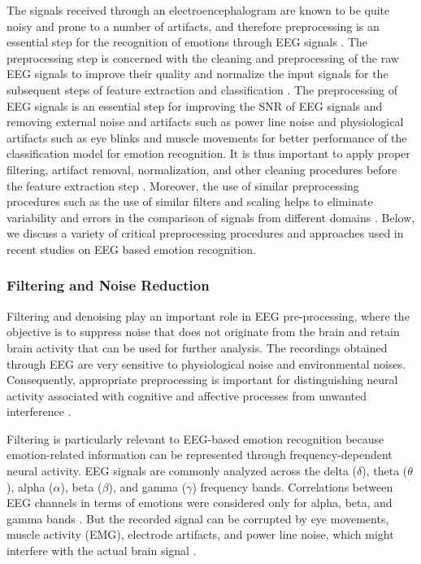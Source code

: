 \documentclass[ASNA,twocolumn]{USG}
\begin{document}
The signals received through an electroencephalogram are known to be quite noisy and prone to a number of artifacts, and therefore preprocessing is an essential step for the recognition of emotions through EEG signals \cite{somers2018generic}. The preprocessing step is concerned with the cleaning and preprocessing of the raw EEG signals to improve their quality and normalize the input signals for the subsequent steps of feature extraction and classification \cite{erat2024emotion}. The preprocessing of EEG signals is an essential step for improving the SNR of EEG signals and removing external noise and artifacts such as power line noise and physiological artifacts such as eye blinks and muscle movements for better performance of the classification model for emotion recognition. It is thus important to apply proper filtering, artifact removal, normalization, and other cleaning procedures before the feature extraction step \cite{val2019optimization}. Moreover, the use of similar preprocessing procedures such as the use of similar filters and scaling helps to eliminate variability and errors in the comparison of signals from different domains \cite{wang2024dmmr}. Below, we discuss a variety of critical preprocessing procedures and approaches used in recent studies on EEG based emotion recognition.


\subsubsection{Filtering and Noise Reduction}
Filtering and denoising play an important role in EEG pre-processing, where the objective is to suppress noise that does not originate from the brain and retain brain activity that can be used for further analysis. The recordings obtained through EEG are very sensitive to physiological noise and environmental noises. Consequently, appropriate preprocessing is important for distinguishing neural activity associated with cognitive and affective processes from unwanted interference \cite{chen2025advances}.

Filtering is particularly relevant to EEG-based emotion recognition because emotion-related information can be represented through frequency-dependent neural activity. EEG signals are commonly analyzed across the delta ($\delta$), theta ($\theta$), alpha ($\alpha$), beta ($\beta$), and gamma ($\gamma$) frequency bands. Correlations between EEG channels in terms of emotions were considered only for alpha, beta, and gamma bands \cite{choong2021correlation}. But the recorded signal can be corrupted by eye movements, muscle activity (EMG), electrode artifacts, and power line noise, which might interfere with the actual brain signal \cite{jiang2019removal}.
\end{document}
